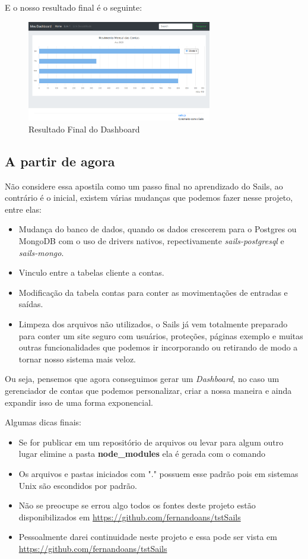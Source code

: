 \documentclass[a4paper,11pt]{article}
\begin{document}
E o nosso resultado final é o seguinte:
\begin{figure}[H]
	\centering
	\includegraphics[width=0.72\textwidth]{imagens/resultadoFinal.png}
	\caption{Resultado Final do Dashboard}
\end{figure}

\subsection{A partir de agora}
Não considere essa apostila como um passo final no aprendizado do Sails, ao contrário é o inicial, existem várias mudanças que podemos fazer nesse projeto, entre elas: \vspace{-1em}
\begin{itemize}
	\item Mudança do banco de dados, quando os dados crescerem para o Postgres ou MongoDB com o uso de drivers nativos, repectivamente \textit{sails-postgresql} e \textit{sails-mongo}.
	\item Vinculo entre a tabelas cliente a contas.
	\item Modificação da tabela contas para conter as movimentações de entradas e saídas.
	\item Limpeza dos arquivos não utilizados, o Sails já vem totalmente preparado para conter um site seguro com usuários, proteções, páginas exemplo e muitas outras funcionalidades que podemos ir incorporando ou retirando de modo a tornar nosso sistema mais veloz.
\end{itemize}

Ou seja, pensemos que agora conseguimos gerar um \textit{Dashboard}, no caso um gerenciador de contas que podemos personalizar, criar a nossa maneira e ainda expandir isso de uma forma exponencial.

Algumas dicas finais: \vspace{-1em}
\begin{itemize}
	\item Se for publicar em um repositório de arquivos ou levar para algum outro lugar elimine a pasta \textbf{node\_modules} ela é gerada com o comando 
	\item Os arquivos e pastas iniciados com "." possuem esse padrão pois em sistemas Unix são escondidos por padrão.
	\item Não se preocupe se errou algo todos os fontes deste projeto estão disponibilizados em \url{https://github.com/fernandoans/tstSails}
	\item Pessoalmente darei continuidade neste projeto e essa pode ser vista em \url{https://github.com/fernandoans/tstSails}
\end{itemize}
\end{document}
